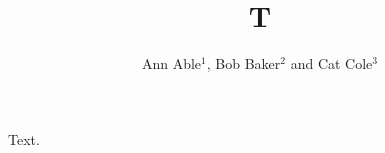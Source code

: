 \documentclass{revtex4-1}
\begin{document}
\title{T}
\author{Ann Able$^{1}$, Bob Baker$^{2}$ and Cat Cole$^{3}$}
\maketitle
Text.
\end{document}
